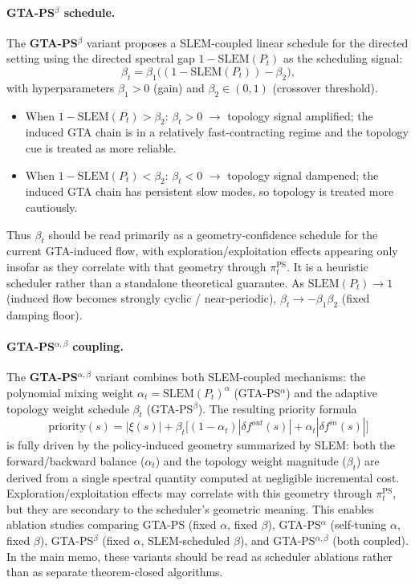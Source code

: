 \documentclass[10pt,a4paper]{article}
\begin{document}
\paragraph{GTA-PS$^{\beta}$ schedule.}
The \textbf{GTA-PS$^{\beta}$} variant proposes a SLEM-coupled linear schedule for the directed
setting using the directed spectral gap $1 - \mathrm{SLEM}(P_t)$ as the scheduling signal:
\[
  \beta_t = \beta_1\bigl((1 - \mathrm{SLEM}(P_t)) - \beta_2\bigr),
\]
with hyperparameters $\beta_1 > 0$ (gain) and $\beta_2 \in (0,1)$ (crossover threshold).
\begin{itemize}
  \item When $1-\mathrm{SLEM}(P_t) > \beta_2$: $\beta_t > 0$ $\rightarrow$ topology signal amplified; the induced GTA
chain is in a relatively fast-contracting regime and the topology cue is treated as more reliable.

  \item When $1-\mathrm{SLEM}(P_t) < \beta_2$: $\beta_t < 0$ $\rightarrow$ topology signal dampened; the induced GTA
chain has persistent slow modes, so topology is treated more cautiously.
\end{itemize}
Thus $\beta_t$ should be read primarily as a geometry-confidence schedule for the
current GTA-induced flow, with exploration/exploitation effects appearing only insofar
as they correlate with that geometry through $\pi_t^{\mathrm{PS}}$.
It is a heuristic scheduler rather than a standalone theoretical guarantee.
As $\mathrm{SLEM}(P_t)\to 1$ (induced flow becomes strongly cyclic / near-periodic),
$\beta_t \to -\beta_1\beta_2$ (fixed damping floor).

\paragraph{GTA-PS$^{\alpha,\beta}$ coupling.}
The \textbf{GTA-PS$^{\alpha,\beta}$} variant combines both SLEM-coupled mechanisms: the
polynomial mixing weight $\alpha_t = \mathrm{SLEM}(P_t)^{\alpha}$ (GTA-PS$^{\alpha}$) and the
adaptive topology weight schedule $\beta_t$ (GTA-PS$^{\beta}$).  The resulting priority formula
\[
  \mathrm{priority}(s) = |\xi(s)| + \beta_t\bigl[(1-\alpha_t)|\delta f^{out}(s)| + \alpha_t|\delta f^{in}(s)|\bigr]
\]
is fully driven by the policy-induced geometry summarized by SLEM: both the
forward/backward balance ($\alpha_t$) and the topology weight magnitude ($\beta_t$)
are derived from a single spectral quantity computed at negligible incremental cost.
Exploration/exploitation effects may correlate with this geometry through
$\pi_t^{\mathrm{PS}}$, but they are secondary to the scheduler's geometric meaning.
This enables ablation studies comparing GTA-PS (fixed $\alpha$, fixed $\beta$),
GTA-PS$^{\alpha}$ (self-tuning $\alpha$, fixed $\beta$), GTA-PS$^{\beta}$ (fixed $\alpha$,
SLEM-scheduled $\beta$), and GTA-PS$^{\alpha,\beta}$ (both coupled).  In the main memo, these variants should be read as scheduler ablations rather than as separate theorem-closed algorithms.
\end{document}
